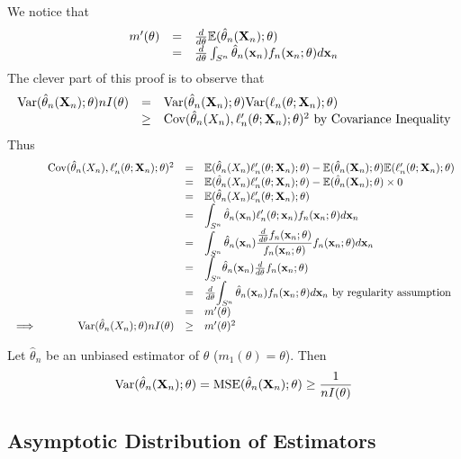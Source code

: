 \documentclass[11pt,a4paper]{article}
\begin{document}
We notice that
\[\begin{array}{rcl}
m'(\theta)&=&\frac{d}{d\theta}\mathbb{E}(\hat{\theta}_n(\textbf{X}_n);\theta)\\
&=&\frac{d}{d\theta}\int_{S^n}\hat{\theta}_n(\textbf{x}_n)f_n(\textbf{x}_n;\theta)d\textbf{x}_n
\end{array}\]
The clever part of this proof is to observe that
\[\begin{array}{rcl}
\mathrm{Var}(\hat{\theta}_n(\textbf{X}_n);\theta)nI(\theta)&=&\mathrm{Var}(\hat{\theta}_n(\textbf{X}_n);\theta)\mathrm{Var}(\ell_n(\theta;\textbf{X}_n);\theta)\\
&\geq&\mathrm{Cov}(\hat{\theta}_n(X_n),\ell'_n(\theta;\textbf{X}_n);\theta)^2\text{ by Covariance Inequality}
\end{array}\]
Thus
\[\begin{array}{rrcl}
&\mathrm{Cov}(\hat{\theta}_n(X_n),\ell'_n(\theta;\textbf{X}_n);\theta)^2&=&\mathbb{E}(\hat{\theta}_n(X_n)\ell_n'(\theta;\textbf{X}_n);\theta)-\mathbb{E}(\hat{\theta}_n(\textbf{X}_n);\theta)\mathbb{E}(\ell'_n(\theta;\textbf{X}_n);\theta)\\
&&=&\mathbb{E}(\hat{\theta}_n(X_n)\ell_n'(\theta;\textbf{X}_n);\theta)-\mathbb{E}(\hat{\theta}_n(\textbf{X}_n);\theta)\times0\\
&&=&\mathbb{E}(\hat{\theta}_n(X_n)\ell_n'(\theta;\textbf{X}_n);\theta)\\
&&=&{\displaystyle\int_{S^n}\hat{\theta}_n(\textbf{x}_n)\ell'_n(\theta;\textbf{x}_n)f_n(\textbf{x}_n;\theta)d\textbf{x}_n}\\
&&=&{\displaystyle\int_{S^n}\hat{\theta}_n(\textbf{x}_n)\frac{\frac{d}{d\theta}f_n(\textbf{x}_n;\theta)}{f_n(\textbf{x}_n;\theta)}f_n(\textbf{x}_n;\theta)d\textbf{x}_n}\\
&&=&{\displaystyle\int_{S^n}}\hat{\theta}_n(\textbf{x}_n)\frac{d}{d\theta}f_n(\textbf{x}_n;\theta)\\
&&=&\frac{d}{d\theta}{\displaystyle\int_{S^n}\hat{\theta}_n(\textbf{x}_n)f_n(\textbf{x}_n;\theta)d\textbf{x}_n}\text{ by regularity assumption}\\
&&=&m'(\theta)\\
\implies&\mathrm{Var}(\hat{\theta}_n(X_n);\theta)nI(\theta)&\geq&m'(\theta)^2
\end{array}\]

Let $\hat\theta_n$ be an unbiased estimator of $\theta$ (\ie $m_1(\theta)=\theta$). Then
$$\mathrm{Var}(\hat\theta_n(\textbf{X}_n);\theta)=\text{MSE}(\hat\theta_n(\textbf{X}_n);\theta)\geq\frac{1}{nI(\theta)}$$

\subsection{Asymptotic Distribution of Estimators}
\end{document}
